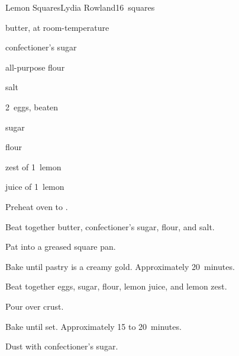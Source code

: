 \begin{recipe}{Lemon Squares}{Lydia Rowland}{16~squares}

\begin{ingredients}
\item \C{\half} butter, at room-temperature
\item \C{\quarter} confectioner's sugar
\item {} all-purpose flour
\item \tp{\half} salt
\item 2~eggs, beaten
\item {} sugar
\item {} flour
\item zest of 1~lemon
\item juice of 1~lemon
\end{ingredients}

\begin{directions}
\item Preheat oven to .
\item Beat together butter, confectioner's sugar,  flour, and salt.
\item Pat into a greased  square pan.
\item Bake until pastry is a creamy gold. Approximately 20~minutes.
\item Beat together eggs, sugar,  flour, lemon juice, and lemon zest.
\item Pour over crust.
\item Bake until set. Approximately 15 to 20~minutes.
\item Dust with confectioner's sugar.
\end{directions}

\end{recipe}
